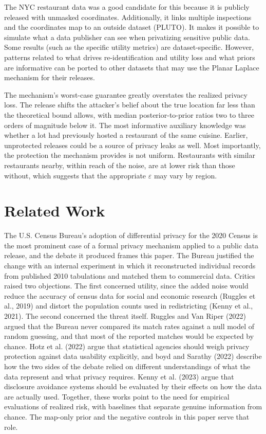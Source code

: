 \documentclass[11pt]{article}
\begin{document}
The NYC restaurant data was a good candidate for this because it is publicly released with unmasked coordinates. Additionally, it links multiple inspections and the coordinates map to an outside dataset (PLUTO). It makes it possible to simulate what a data publisher can see when privatizing sensitive public data. Some results (such as the specific utility metrics) are dataset-specific. However, patterns related to what drives re-identification and utility loss and what priors are informative can be ported to other datasets that may use the Planar Laplace mechanism for their releases. 

The mechanism’s worst-case guarantee greatly overstates the realized privacy loss. The release shifts the attacker’s belief about the true location far less than the theoretical bound allows, with median posterior-to-prior ratios two to three orders of magnitude below it. The most informative auxiliary knowledge was whether a lot had previously hosted a restaurant of the same cuisine. Earlier, unprotected releases could be a source of privacy leaks as well. Most importantly, the protection the mechanism provides is not uniform. Restaurants with similar restaurants nearby, within reach of the noise, are at lower risk than those without, which suggests that the appropriate $\varepsilon$ may vary by region.

\section{Related Work}

The U.S. Census Bureau's adoption of differential privacy for the 2020 Census is the most prominent case of a formal privacy mechanism applied to a public data release, and the debate it produced frames this paper. The Bureau justified the change with an internal experiment in which it reconstructed individual records from published 2010 tabulations and matched them to commercial data. Critics raised two objections. The first concerned utility, since the added noise would reduce the accuracy of census data for social and economic research (Ruggles et al., 2019) and distort the population counts used in redistricting (Kenny et al., 2021). The second concerned the threat itself. Ruggles and Van Riper (2022) argued that the Bureau never compared its match rates against a null model of random guessing, and that most of the reported matches would be expected by chance. Hotz et al. (2022) argue that statistical agencies should weigh privacy protection against data usability explicitly, and boyd and Sarathy (2022) describe how the two sides of the debate relied on different understandings of what the data represent and what privacy requires. Kenny et al. (2023) argue that disclosure avoidance systems should be evaluated by their effects on how the data are actually used. Together, these works point to the need for empirical evaluations of realized risk, with baselines that separate genuine information from chance. The map-only prior and the negative controls in this paper serve that role.
\end{document}
